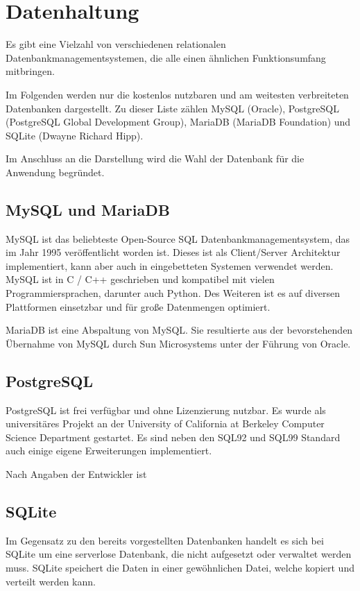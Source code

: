 \section{Datenhaltung} \label{sec:Datenhaltung}
Es gibt eine Vielzahl von verschiedenen relationalen Datenbankmanagementsystemen, die alle einen ähnlichen Funktionsumfang mitbringen.

Im Folgenden werden nur die kostenlos nutzbaren und am weitesten verbreiteten Datenbanken dargestellt. Zu dieser Liste zählen MySQL (Oracle), PostgreSQL (PostgreSQL Global Development Group), MariaDB (MariaDB Foundation) und SQLite (Dwayne Richard Hipp). \cite{db-enginesDBEnginesRanking}

Im Anschluss an die Darstellung wird die Wahl der Datenbank für die Anwendung begründet.

\subsection{MySQL und MariaDB}
MySQL ist das beliebteste Open-Source SQL Datenbankmanagementsystem, das im Jahr 1995 veröffentlicht worden ist. Dieses ist als Client/Server Architektur implementiert, kann aber auch in eingebetteten Systemen verwendet werden. \cite{oraclecorporationMySQLMySQLReference2020} MySQL ist in C / C++ geschrieben und kompatibel mit vielen Programmiersprachen, darunter auch Python. Des Weiteren ist es auf diversen Plattformen einsetzbar und für große Datenmengen optimiert. \cite{oraclecorporationMySQLMySQLReference2020a}

MariaDB ist eine Abspaltung von MySQL. Sie resultierte aus der bevorstehenden Übernahme von MySQL durch Sun Microsystems unter der Führung von Oracle. \cite{ionosMariaDBVsMySQL2020}

\subsection{PostgreSQL}
PostgreSQL ist frei verfügbar und ohne Lizenzierung nutzbar. Es wurde als universitäres Projekt an der University of California at Berkeley Computer Science Department gestartet. Es sind neben den SQL92 und SQL99 Standard auch einige eigene Erweiterungen implementiert. \cite{boenigkWasIstPostgreSQL} 

Nach Angaben der Entwickler ist  

\subsection{SQLite}
Im Gegensatz zu den bereits vorgestellten Datenbanken handelt es sich bei SQLite um eine serverlose Datenbank, die nicht aufgesetzt oder verwaltet werden muss. SQLite speichert die Daten in einer gewöhnlichen Datei, welche kopiert und verteilt werden kann. \cite{sqliteFeaturesSQLite}

